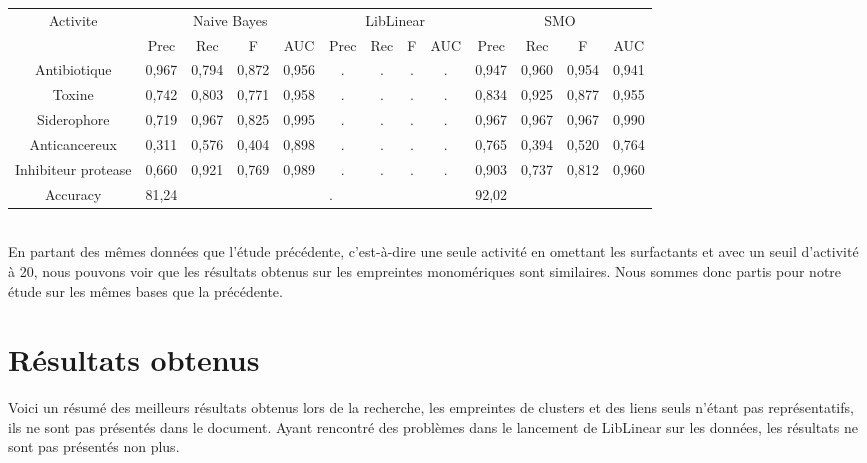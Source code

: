 \documentclass[a4paper,10pt]{report}
\begin{document}
	  
	   \begin{flushleft}
	    \leftskip -3cm
	    \begin{tabular}{|c||c|c|c|c||c|c|c|c||c|c|c|c|}\hline
	      {Activite} & \multicolumn{4}{c||}{Naive Bayes} & \multicolumn{4}{c||}{LibLinear} & \multicolumn{4}{c|}{SMO} \\\cline{2-13}
	       & Prec & Rec & F & AUC & Prec & Rec & F & AUC & Prec & Rec & F & AUC \\\hline
	      Antibiotique & 0,967 & 0,794 & 0,872 & 0,956 & . & . & . & . & 0,947 & 0,960 & 0,954 & 0,941 \\\hline
	      Toxine & 0,742 & 0,803 & 0,771 & 0,958 & . & . & . & . & 0,834 & 0,925 & 0,877 & 0,955  \\\hline
	      Siderophore & 0,719 & 0,967 & 0,825 & 0,995 & . & . & . & . & 0,967 & 0,967 & 0,967 & 0,990  \\\hline
	      Anticancereux & 0,311 & 0,576 & 0,404 & 0,898 & . & . & . & . & 0,765 & 0,394 & 0,520 & 0,764 \\\hline
	      Inhibiteur protease & 0,660 & 0,921 & 0,769 & 0,989 & . & . & . & . & 0,903 & 0,737 & 0,812 & 0,960 \\\hline
	      Accuracy & \multicolumn{4}{l||}{81,24} & \multicolumn{4}{l||}{.} & \multicolumn{4}{l|}{92,02} \\\hline
	    \end{tabular}
	     \label{table 2}
	  \end{flushleft}
	  
	 \\
	 En partant des mêmes données que l'étude précédente, c'est-à-dire une seule activité en omettant les surfactants et avec un seuil d'activité à 20, nous pouvons voir que les résultats obtenus sur les empreintes monomériques sont similaires.
	 Nous sommes donc partis pour notre étude sur les mêmes bases que la précédente.
	 
	 
      \section{Résultats obtenus}
	 
	  Voici un résumé des meilleurs résultats obtenus lors de la recherche, les empreintes de clusters et des liens seuls n'étant pas représentatifs, ils ne sont pas présentés dans le document.
	  Ayant rencontré des problèmes dans le lancement de LibLinear sur les données, les résultats ne sont pas présentés non plus.
	
\end{document}
